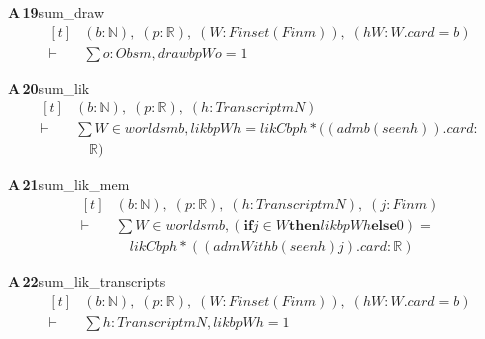 \documentclass[conference]{IEEEtran}
\theoremstyle{definition}
\newcommand{\lean}[1]{\textsf{\footnotesize #1}}
\begin{document}
\noindent\textbf{A\,19}\quad\lean{sum\_draw}
{\footnotesize\[ \begin{aligned}[t]
&(\mathit{b} : \mathbb{N} ),\; (\mathit{p} : \mathbb{R} ),\; (\mathit{W} : \mathit{Finset} (\mathit{Fin} \mathit{m})),\; (\mathit{hW} : \mathit{W}.\mathit{card} = \mathit{b})\\
\vdash\;&\textstyle\sum \mathit{o} : \mathit{Obs} \mathit{m}, \mathit{draw} \mathit{b} \mathit{p} \mathit{W} \mathit{o} = 1
\end{aligned} \]}

\noindent\textbf{A\,20}\quad\lean{sum\_lik}
{\footnotesize\[ \begin{aligned}[t]
&(\mathit{b} : \mathbb{N} ),\; (\mathit{p} : \mathbb{R} ),\; (\mathit{h} : \mathit{Transcript} \mathit{m} \mathit{N})\\
\vdash\;&\textstyle\sum \mathit{W} \in \mathit{worlds} \mathit{m} \mathit{b}, \mathit{lik} \mathit{b} \mathit{p} \mathit{W} \mathit{h} = \mathit{likC} \mathit{b} \mathit{p} \mathit{h} * ((\mathit{adm} \mathit{b} (\mathit{seen} \mathit{h})).\mathit{card} :\\
&\quad \mathbb{R} )
\end{aligned} \]}

\noindent\textbf{A\,21}\quad\lean{sum\_lik\_mem}
{\footnotesize\[ \begin{aligned}[t]
&(\mathit{b} : \mathbb{N} ),\; (\mathit{p} : \mathbb{R} ),\; (\mathit{h} : \mathit{Transcript} \mathit{m} \mathit{N}),\; (\mathit{j} : \mathit{Fin} \mathit{m})\\
\vdash\;&\textstyle\sum \mathit{W} \in \mathit{worlds} \mathit{m} \mathit{b}, (\mathbf{if} \mathit{j} \in \mathit{W} \mathbf{then} \mathit{lik} \mathit{b} \mathit{p} \mathit{W} \mathit{h} \mathbf{else} 0) =\\
&\quad \mathit{likC} \mathit{b} \mathit{p} \mathit{h} * ((\mathit{admWith} \mathit{b} (\mathit{seen} \mathit{h}) \mathit{j}).\mathit{card} : \mathbb{R} )
\end{aligned} \]}

\noindent\textbf{A\,22}\quad\lean{sum\_lik\_transcripts}
{\footnotesize\[ \begin{aligned}[t]
&(\mathit{b} : \mathbb{N} ),\; (\mathit{p} : \mathbb{R} ),\; (\mathit{W} : \mathit{Finset} (\mathit{Fin} \mathit{m})),\; (\mathit{hW} : \mathit{W}.\mathit{card} = \mathit{b})\\
\vdash\;&\textstyle\sum \mathit{h} : \mathit{Transcript} \mathit{m} \mathit{N}, \mathit{lik} \mathit{b} \mathit{p} \mathit{W} \mathit{h} = 1
\end{aligned} \]}
\end{document}
